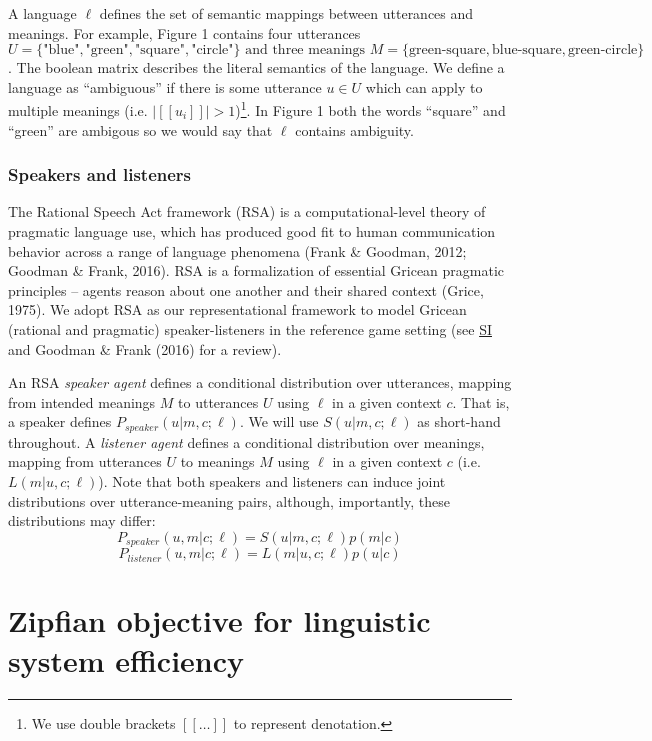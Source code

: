 \documentclass[10pt, letterpaper]{article}
\begin{document}
A language \(\ell\) defines the set of semantic mappings between
utterances and meanings. For example, Figure 1 contains four utterances
\(U = \{\text{"blue"}, \text{"green"}, \text{"square"}, \text{"circle"}\} \text{ and three meanings }M = \{\text{green-square}, \text{blue-square}, \text{green-circle}\}\).
The boolean matrix describes the literal semantics of the language. We
define a language as ``ambiguous'' if there is some utterance
\(u \in U\) which can apply to multiple meanings (i.e.
\(|[[u_i]]| > 1\))\footnote{We use double brackets $[[\dots]]$ to represent denotation.}.
In Figure 1 both the words ``square'' and ``green'' are ambigous so we
would say that \(\ell\) contains ambiguity.

\subsubsection{Speakers and listeners}\label{speakers-and-listeners}

The Rational Speech Act framework (RSA) is a computational-level theory
of pragmatic language use, which has produced good fit to human
communication behavior across a range of language phenomena (Frank \&
Goodman, 2012; Goodman \& Frank, 2016). RSA is a formalization of
essential Gricean pragmatic principles -- agents reason about one
another and their shared context (Grice, 1975). We adopt RSA as our
representational framework to model Gricean (rational and pragmatic)
speaker-listeners in the reference game setting (see
\href{https://github.com/benpeloquin7/zipf_principles/blob/master/paper/supplementary_materials.pdf}{SI}
and Goodman \& Frank (2016) for a review).\par

An RSA \emph{speaker agent} defines a conditional distribution over
utterances, mapping from intended meanings \(M\) to utterances \(U\)
using \(\ell\) in a given context \(c\). That is, a speaker defines
\(P_{speaker}(u|m, c; \ell)\). We will use \(S(u|m, c; \ell)\) as
short-hand throughout. A \emph{listener agent} defines a conditional
distribution over meanings, mapping from utterances \(U\) to meanings
\(M\) using \(\ell\) in a given context \(c\) (i.e. \(L(m|u, c;\ell)\)).
Note that both speakers and listeners can induce joint distributions
over utterance-meaning pairs, although, importantly, these distributions
may differ: \[P_{speaker}(u, m | c; \ell) = S(u|m, c; \ell)p(m|c)\]
\[P_{listener}(u, m| c; \ell) = L(m|u, c; \ell)p(u|c)\]

\section{Zipfian objective for linguistic system
efficiency}\label{zipfian-objective-for-linguistic-system-efficiency}
\end{document}
